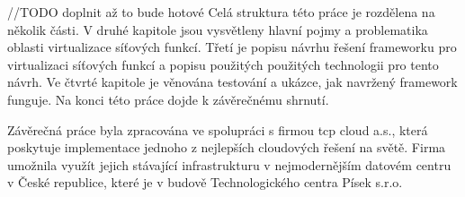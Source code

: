 //TODO doplnit až to bude hotové
Celá struktura této práce je rozdělena na několik části. V druhé kapitole jsou vysvětleny hlavní pojmy a problematika oblasti virtualizace síťových funkcí. Třetí je popisu návrhu řešení frameworku pro virtualizaci síťových funkcí a popisu použitých použitých technologii pro tento návrh. Ve čtvrté kapitole je věnována testování a ukázce, jak navržený framework funguje. Na konci této práce dojde k závěrečnému shrnutí.

Závěrečná práce byla zpracována ve spolupráci s firmou tcp cloud a.s., která poskytuje implementace jednoho z nejlepších cloudových řešení na světě. Firma umožnila využít jejich stávající infrastrukturu v nejmodernějším datovém centru v České republice, které je v budově Technologického centra Písek s.r.o.



